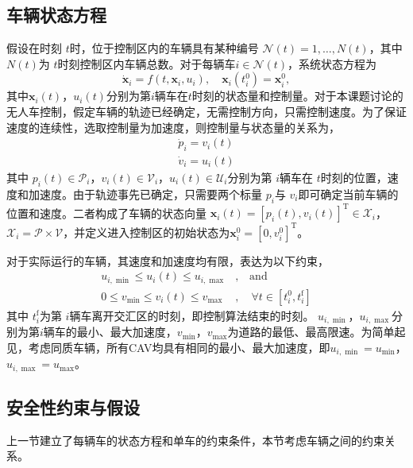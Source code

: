\subsection{车辆状态方程}
假设在时刻 $t$时，位于控制区内的车辆具有某种编号 $\mathcal{N}(t)={1,\dots,N(t)}$，其中 $N(t)$为 $t$时刻控制区内车辆总数。对于每辆车$i\in \mathcal{N}(t)$，系统状态方程为
\begin{equation}
\dot{\bm{x}}_i=f(t,\bm{x}_i,u_i),\quad \bm{x}_i(t_i^0)=\bm{x}_i^0,
\end{equation}
其中$\bm{x}_i(t)$，$u_i(t)$分别为第$i$辆车在$t$时刻的状态量和控制量。对于本课题讨论的无人车控制，假定车辆的轨迹已经确定，无需控制方向，只需控制速度。为了保证速度的连续性，选取控制量为加速度，则控制量与状态量的关系为，
\begin{equation}
\begin{gathered}
\dot{p}_i=v_i(t)\\
\dot{v}_i=u_i(t)
\end{gathered}
\label{eq:state}
\end{equation}
其中 $p_i(t)\in \mathcal{P}_i$，$v_i(t)\in \mathcal{V}_i$，$u_i(t)\in \mathcal{U}_i$分别为第 $i$辆车在 $t$时刻的位置，速度和加速度。由于轨迹事先已确定，只需要两个标量 $p_i$与 $v_i$即可确定当前车辆的位置和速度。二者构成了车辆的状态向量 $\bm{x}_i(t)=[p_i(t), v_i(t)]^\mathrm{T}\in \mathcal{X}_i$，$\mathcal{X}_i=\mathcal{P}\times\mathcal{V}$，并定义进入控制区的初始状态为$\bm{x}_i^0 = [0, v_i^0]^\mathrm{T}$。

对于实际运行的车辆，其速度和加速度均有限，表达为以下约束，
\begin{equation}
\begin{aligned}
u_{i,\min}\leq u_i(t)\leq u_{i,\max}&, \quad \text{and}\\
0\leq v_{\min}\leq v_i(t)\leq v_{\max}&, \quad \forall t\in[t_i^0, t_i^\mathrm{f}]
\end{aligned}
\label{eq:single_constraint}
\end{equation}
其中 $t_i^\mathrm{f}$为第 $i$辆车离开交汇区的时刻，即控制算法结束的时刻。 $u_{i,\min}$，$u_{i,\max}$分别为第$i$辆车的最小、最大加速度，$v_{\min}$，$v_{\max}$为道路的最低、最高限速。为简单起见，考虑同质车辆，所有CAV均具有相同的最小、最大加速度，即$u_{i,\min}=u_{\min}$，$u_{i,\max}=u_{\max}$。

\subsection{安全性约束与假设}
上一节建立了每辆车的状态方程和单车的约束条件，本节考虑车辆之间的约束关系。

